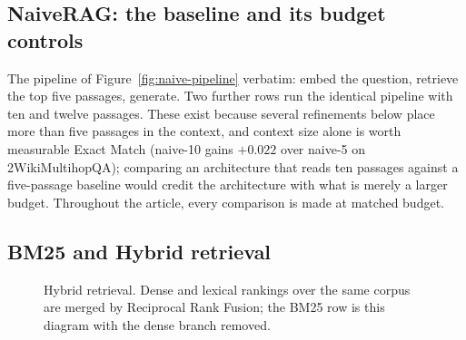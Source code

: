 \subsection{NaiveRAG: the baseline and its budget controls}
\label{sec:arch-naive}

The pipeline of Figure~\ref{fig:naive-pipeline} verbatim: embed the
question, retrieve the top five passages, generate. Two further rows run
the identical pipeline with ten and twelve passages. These exist because
several refinements below place more than five passages in the context, and
context size alone is worth measurable Exact Match (naive-10 gains $+0.022$
over naive-5 on 2WikiMultihopQA); comparing an architecture that reads ten
passages against a five-passage baseline would credit the architecture with
what is merely a larger budget. Throughout the article, every comparison
is made at matched budget.

\subsection{BM25 and Hybrid retrieval}
\label{sec:arch-hybrid}

\begin{figure}[t]
\centering
{}
\caption{Hybrid retrieval. Dense and lexical rankings over the same corpus
are merged by Reciprocal Rank Fusion; the BM25 row is this diagram with
the dense branch removed.}
\label{fig:arch-hybrid}
\end{figure}

